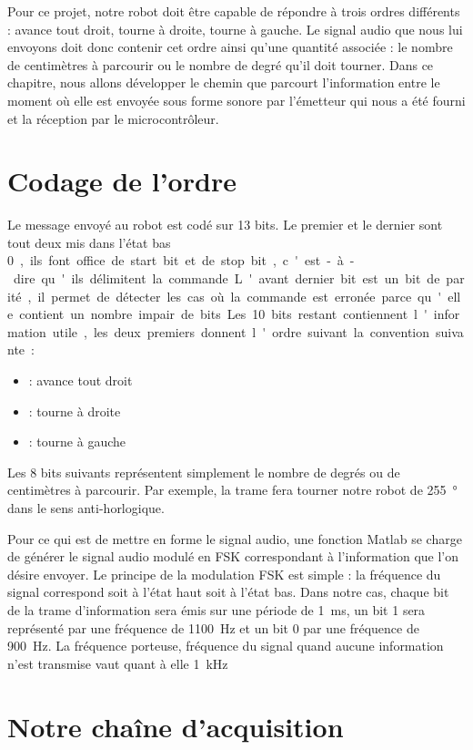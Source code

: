 Pour ce projet, notre robot doit être capable de répondre à trois ordres différents : avance tout droit, tourne à droite, tourne à gauche. Le signal audio que nous lui envoyons doit donc contenir cet ordre ainsi qu'une quantité associée : le nombre de centimètres à parcourir ou le nombre de degré qu'il doit tourner. Dans ce chapitre, nous allons développer le chemin que parcourt l'information entre le moment où elle est envoyée sous forme sonore par l'émetteur qui nous a été fourni et la réception par le microcontrôleur.

\section{Codage de l'ordre}
Le message envoyé au robot est codé sur 13 bits. Le premier et le dernier sont tout deux mis dans l'état bas \SI{0}, ils font office de start bit et de stop bit, c'est-à-dire qu'ils délimitent la commande. L'avant dernier bit est un bit de parité, il permet de détecter les cas où la commande est erronée parce qu'elle contient un nombre impair de bits. Les \SI{10} bits restant contiennent l'information utile, les deux premiers donnent l'ordre suivant la convention suivante :
\begin{itemize}
\item {} : avance tout droit
\item {} : tourne à droite
\item {} : tourne à gauche
\end{itemize}
Les 8 bits suivants représentent simplement le nombre de degrés ou de centimètres à parcourir. Par exemple, la trame  fera tourner notre robot de \SI{255}{\degree} dans le sens anti-horlogique.

Pour ce qui est de mettre en forme le signal audio, une fonction Matlab se charge de générer le signal audio modulé en FSK correspondant à l'information que l'on désire envoyer. Le principe de la modulation FSK est simple : la fréquence du signal correspond soit à l'état haut soit à l'état bas. Dans notre cas, chaque bit de la trame d'information sera émis sur une période de \SI{1}{\milli\second}, un bit 1 sera représenté par une fréquence de \SI{1100}{\hertz} et un bit 0 par une fréquence de \SI{900}{\hertz}. La fréquence porteuse, fréquence du signal quand aucune information n'est transmise vaut quant à elle \SI{1}{\kilo\hertz}
\section{Notre chaîne d'acquisition}